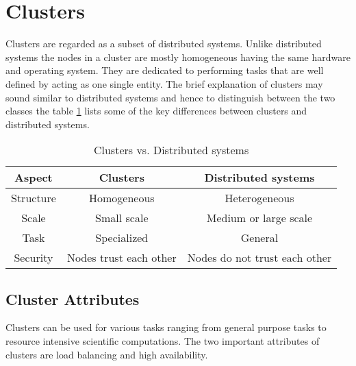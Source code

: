 \section{Clusters}

Clusters are regarded as a subset of distributed systems. Unlike distributed systems the nodes in a cluster are mostly homogeneous having the same hardware and operating system. They are dedicated to performing tasks that are well defined by acting as one single entity. The brief explanation of clusters may sound similar to distributed systems and hence to distinguish between the two classes the table \ref{table:cluster_vs_distributed_systems} lists some of the key differences between clusters and distributed systems.

\begin{table}[h]
  \centering
  \caption{Clusters vs. Distributed systems}
  \label{table:cluster_vs_distributed_systems}
  \begin{tabular}{ccc}
    \toprule
    Aspect & Clusters & Distributed systems\\
    \midrule
    Structure & Homogeneous & Heterogeneous\\
    Scale & Small scale & Medium or large scale\\
    Task & Specialized & General\\
    Security & Nodes trust each other & Nodes do not trust each other\\
    \bottomrule
  \end{tabular}
\end{table}

\subsection{Cluster Attributes}

Clusters can be used for various tasks ranging from general purpose tasks to resource intensive scientific computations. The two important attributes of clusters are load balancing and high availability.

